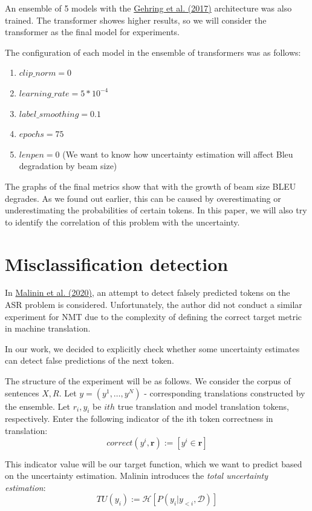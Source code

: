 \documentclass[a4paper,14pt]{extarticle}
\newcommand{\bibref}[3]{\hyperlink{#1}{#2 (#3)}}
\begin{document}
	An ensemble of 5 models with the \bibref{fconv}{Gehring et al.}{2017} architecture was also trained. The transformer showes higher results, so we will consider the transformer as the final model for experiments.
	
	The configuration of each model in the ensemble of transformers was as follows:
	\begin{enumerate}
		\item $clip\_norm = 0$
		\item $learning\_rate=5*10^{-4}$
		\item $label\_smoothing=0.1$
		\item $epochs=75$
		\item $lenpen=0$ (We want to know how uncertainty estimation will affect Bleu degradation by beam size)
	\end{enumerate}
	
	The graphs of the final metrics show that with the growth of beam size BLEU degrades. As we found out earlier, this can be caused by overestimating or underestimating the probabilities of certain tokens. In this paper, we will also try to identify the correlation of this problem with the uncertainty.
	
\section{Misclassification detection}
	In \bibref{uncertainty}{Malinin et al.} {2020}, an attempt to detect falsely predicted tokens on the ASR problem is considered. Unfortunately, the author did not conduct a similar experiment for NMT due to the complexity of defining the correct target metric in machine translation.

	In our work, we decided to explicitly check whether some uncertainty estimates can detect false predictions of the next token.

	The structure of the experiment will be as follows. We consider the corpus of sentences $X, R$. Let $y = (y^1, \dots, y^N)$ - corresponding translations constructed by the ensemble. Let $r_{i}, y_{i}$ be $ith$  true translation and model translation tokens, respectively. Enter the following indicator of the ith token correctness in translation:
	\begin{equation}
		correct(y^{i}, \textbf{r}) := [y^{i} \in \textbf{r}]
	\end{equation}
	
	This indicator value will be our target function, which we want to predict based on the uncertainty estimation. Malinin introduces the \textit{total uncertainty estimation}:
	\begin{equation}
		TU(y_i) := \mathcal{H}[P(y_i|y_{<i}, \mathcal{D})]
	\end{equation}
	
\end{document}
